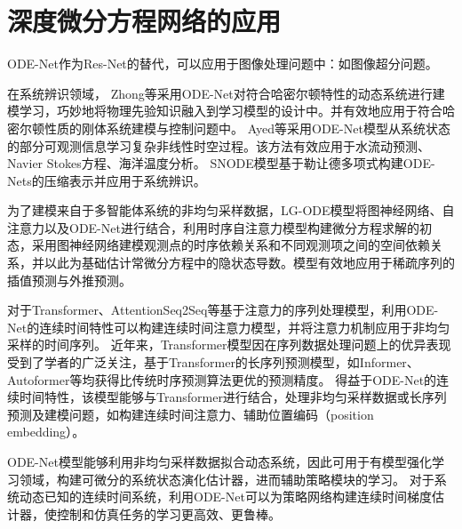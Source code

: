 \section{深度微分方程网络的应用}
ODE-Net作为Res-Net的替代，可以应用于图像处理问题中：如图像超分问题\cite{OISR,jia2019focnet}。

在系统辨识领域，
Zhong等\cite{zhong2019symplectic}采用ODE-Net对符合哈密尔顿特性的动态系统进行建模学习，巧妙地将物理先验知识融入到学习模型的设计中。并有效地应用于符合哈密尔顿性质的刚体系统建模与控制问题中。
Ayed等\cite{ayed2019learning}采用ODE-Net模型从系统状态的部分可观测信息学习复杂非线性时空过程。该方法有效应用于水流动预测、Navier Stokes方程、海洋温度分析。
SNODE\cite{Quaglino2019}模型基于勒让德多项式构建ODE-Nets的压缩表示并应用于系统辨识。

为了建模来自于多智能体系统的非均匀采样数据，LG-ODE模型\cite{Huang2020}将图神经网络、自注意力以及ODE-Net进行结合，利用时序自注意力模型构建微分方程求解的初态，采用图神经网络建模观测点的时序依赖关系和不同观测项之间的空间依赖关系，并以此为基础估计常微分方程中的隐状态导数。模型有效地应用于稀疏序列的插值预测与外推预测。


对于Transformer、AttentionSeq2Seq等基于注意力的序列处理模型，利用ODE-Net的连续时间特性可以构建连续时间注意力模型\cite{chen2021continuous}，并将注意力机制应用于非均匀采样的时间序列。
近年来，Transformer模型\cite{Vaswani2017}因在序列数据处理问题上的优异表现受到了学者的广泛关注，基于Transformer的长序列预测模型，如Informer\cite{Zhou2020}、Autoformer\cite{Wu2021}等均获得比传统时序预测算法更优的预测精度。
得益于ODE-Net的连续时间特性，该模型能够与Transformer进行结合，处理非均匀采样数据或长序列预测及建模问题，如构建连续时间注意力\cite{chen2021continuous}、辅助位置编码（position embedding）\cite{Liu2020}。

ODE-Net模型能够利用非均匀采样数据拟合动态系统，因此可用于有模型强化学习\cite{Yildiz2021}领域，构建可微分的系统状态演化估计器，进而辅助策略模块的学习。
对于系统动态已知的连续时间系统，利用ODE-Net可以为策略网络构建连续时间梯度估计器\cite{Ainsworth2020}，使控制和仿真任务的学习更高效、更鲁棒。





